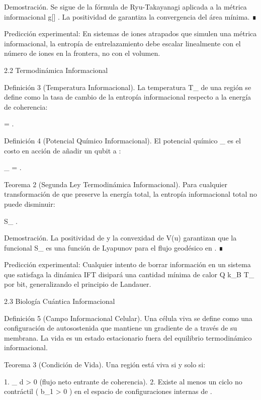 \documentclass[12pt,a4paper]{book}
\begin{document}
Demostración. Se sigue de la fórmula de Ryu-Takayanagi aplicada a la métrica informacional  g[\rho] . La positividad de  \rho  garantiza la convergencia del área mínima. ∎

Predicción experimental: En sistemas de iones atrapados que simulen una métrica informacional, la entropía de entrelazamiento debe escalar linealmente con el número de iones en la frontera, no con el volumen.

2.2 Termodinámica Informacional

Definición 3 (Temperatura Informacional). La temperatura  T_{}  de una región  \Omega  se define como la tasa de cambio de la entropía informacional respecto a la energía de coherencia:

 = .
\]  

Definición 4 (Potencial Químico Informacional). El potencial químico  \mu_{}  es el costo en acción de añadir un qubit a  \Omega :

\mu_{} = .
\]  

Teorema 2 (Segunda Ley Termodinámica Informacional). Para cualquier transformación de  \rho  que preserve la energía total, la entropía informacional total no puede disminuir:

\Delta S_{} .
\]  

Demostración. La positividad de  \rho  y la convexidad de  V(u)  garantizan que la funcional  S_{}  es una función de Lyapunov para el flujo geodésico en   . ∎

Predicción experimental: Cualquier intento de borrar información en un sistema que satisfaga la dinámica IFT disipará una cantidad mínima de calor  Q \ge k_B T_{}   por bit, generalizando el principio de Landauer.

2.3 Biología Cuántica Informacional

Definición 5 (Campo Informacional Celular). Una célula viva se define como una configuración de  \rho  autosostenida que mantiene un gradiente de  \nabla \rho {}  a través de su membrana. La vida es un estado estacionario fuera del equilibrio termodinámico informacional.

Teorema 3 (Condición de Vida). Una región  \Omega  está viva si y solo si:

1.  \int_{\partial\Omega} \nabla \rho \cdot d > 0  (flujo neto entrante de coherencia).
2. Existe al menos un ciclo no contráctil ( b_1 > 0 ) en el espacio de configuraciones internas de  \rho .
\end{document}
